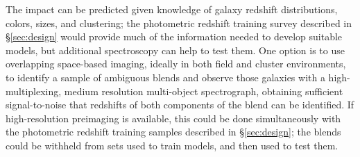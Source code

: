 The impact can be predicted given knowledge of galaxy redshift distributions, colors, sizes, and clustering; the photometric redshift training survey described in \S \ref{sec:design} would provide much of the information needed to develop suitable models, but additional spectroscopy can help to test them.  One option is to use overlapping space-based imaging, ideally in both field and cluster environments, to identify a sample of ambiguous blends and observe those galaxies
with a high-multiplexing, medium resolution multi-object spectrograph, obtaining sufficient signal-to-noise that redshifts of both components of the blend can be identified.  If high-resolution preimaging is available, this could be done simultaneously with the photometric redshift training samples described in \S \ref{sec:design}; the blends could be withheld from sets used to train models, and then used to test them.  

%
